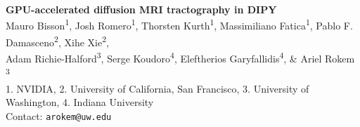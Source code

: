 \documentclass[a0, landscape]{a0poster}
\begin{document}


\begin{minipage}[b]{0.60\linewidth}
\Huge \color{NavyBlue} \textbf{GPU-accelerated diffusion MRI tractography in DIPY} \color{Black} \\ %
{\LARGE Mauro Bisson\textsuperscript{1}, Josh Romero\textsuperscript{1}, Thorsten Kurth\textsuperscript{1}, Massimiliano Fatica\textsuperscript{1}, Pablo F. Damasceno\textsuperscript{2}, Xihe Xie\textsuperscript{2},\\ Adam Richie-Halford\textsuperscript{3}, Serge Koudoro\textsuperscript{4}, Eleftherios Garyfallidis\textsuperscript{4}, \&  Ariel Rokem \textsuperscript{3}}\\ %
\Large 1. NVIDIA, 2. University of California, San Francisco, 3. University of Washington, 4. Indiana University  \\ %
\Large Contact: \texttt{arokem@uw.edu}
\end{minipage}
%
%
\end{document}
